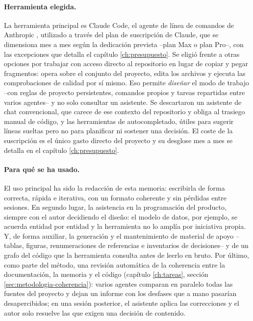 \paragraph{Herramienta elegida.}
La herramienta principal es Claude Code, el agente de línea de comandos de Anthropic \parencite{claude-code-docs}, utilizado a través del plan de suscripción de Claude, que se dimensiona mes a mes según la dedicación prevista --plan Max o plan Pro--, con las excepciones que detalla el capítulo \ref{ch:presupuesto}.
Se eligió frente a otras opciones por trabajar con acceso directo al repositorio en lugar de copiar y pegar fragmentos: opera sobre el conjunto del proyecto, edita los archivos y ejecuta las comprobaciones de calidad por sí mismo.
Eso permite \emph{diseñar} el modo de trabajo --con reglas de proyecto persistentes, comandos propios y tareas repartidas entre varios agentes-- y no solo consultar un asistente.
Se descartaron un asistente de chat convencional, que carece de ese contexto del repositorio y obliga al trasiego manual de código, y las herramientas de autocompletado, útiles para sugerir líneas sueltas pero no para planificar ni sostener una decisión.
El coste de la suscripción es el único gasto directo del proyecto y su desglose mes a mes se detalla en el capítulo \ref{ch:presupuesto}.

\paragraph{Para qué se ha usado.}
El uso principal ha sido la redacción de esta memoria: escribirla de forma correcta, rápida e iterativa, con un formato coherente y sin pérdidas entre sesiones.
En segundo lugar, la asistencia en la programación del producto, siempre con el autor decidiendo el diseño: el modelo de datos, por ejemplo, se acuerda entidad por entidad y la herramienta no lo amplía por iniciativa propia.
Y, de forma auxiliar, la generación y el mantenimiento de material de apoyo --tablas, figuras, renumeraciones de referencias e inventarios de decisiones-- y de un grafo del código que la herramienta consulta antes de leerlo en bruto.
Por último, como parte del método, una revisión automática de la coherencia entre la documentación, la memoria y el código (capítulo \ref{ch:tareas}, sección \ref{sec:metodologia-coherencia}): varios agentes comparan en paralelo todas las fuentes del proyecto y dejan un informe con los desfases que a mano pasarían desapercibidos; en una sesión posterior, el asistente aplica las correcciones y el autor solo resuelve las que exigen una decisión de contenido.

